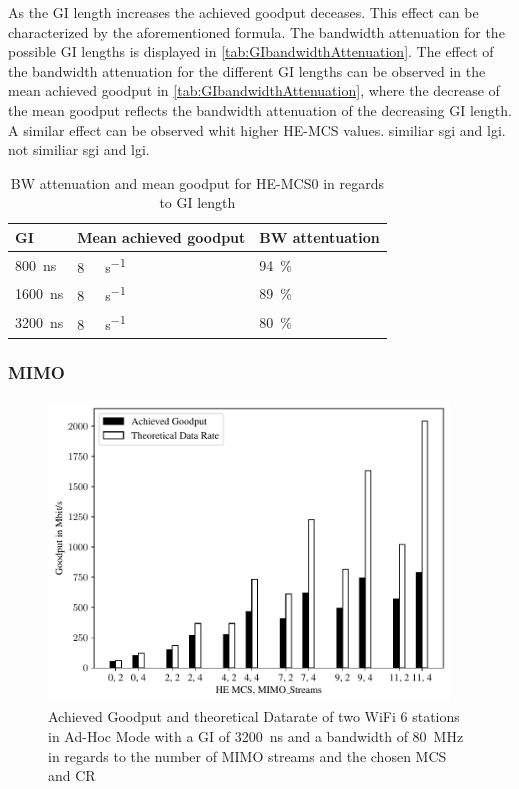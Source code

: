 As the \ac{GI} length increases the achieved goodput deceases. This effect can be characterized by the aforementioned formula.
The bandwidth attenuation for the possible \ac{GI} lengths is displayed in \autoref{tab:GIbandwidthAttenuation}.
The effect of the bandwidth attenuation for the different \ac{GI} lengths can be observed in the mean achieved goodput in
\autoref{tab:GIbandwidthAttenuation}, where the decrease of the mean goodput reflects the bandwidth attenuation of the decreasing \ac{GI} length.
A similar effect can be observed whit higher HE-\ac{MCS} values.
\textcite{Pravinkumar Patil} similiar sgi and lgi.
\textcite{Prasad} not similiar sgi and lgi.
\begin{table}[H]
	\centering
	\begin{tabular}{>{\centering}p{3cm}p{4cm}p{4cm}}
		\toprule
		\ac{GI} & Mean achieved goodput & \ac{BW} attentuation\\
		\midrule
		\SI{800}{\nano\second} & \SI{8}{\giga\bit\per\second}&
		\SI{94}{\percent} \\
		\SI{1600}{\nano\second} &
		\SI{8}{\giga\bit\per\second}&
		\SI{89}{\percent} \\
		\SI{3200}{\nano\second} & \SI{8}{\giga\bit\per\second}&
		\SI{80}{\percent} \\
		\bottomrule
	\end{tabular}
	\caption{\ac{BW} attenuation and mean goodput for HE-\ac{MCS}0 in regards to \ac{GI} length}
	\label{tab:GIbandwidthAttenuation}
\end{table}

\subsubsection*{\acf{MIMO}}

\begin{figure}%
	\centering
	\includegraphics[width=0.95\textwidth]{figures/mimo_dataRate_simulation.pdf}
	\caption{Achieved Goodput and theoretical Datarate of two WiFi 6 stations in Ad-Hoc Mode with a \ac{GI} of \SI{3200}{\nano\second} and a bandwidth of \SI{80}{\mega\hertz} in regards to the number of \ac{MIMO} streams and the chosen \ac{MCS} and \ac{CR}}%
	\label{fig:Data_rate_Mimo}%
\end{figure}

